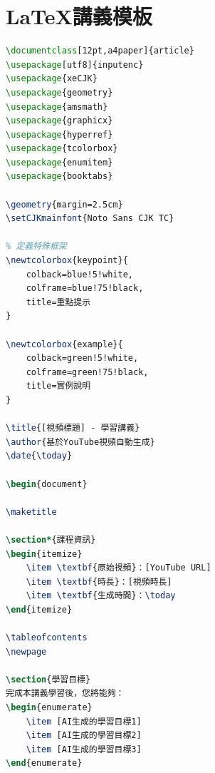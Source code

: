 \documentclass[12pt,a4paper]{article}
\begin{document}
\section{LaTeX講義模板}

\begin{lstlisting}[language=TeX, caption=YouTube講義LaTeX模板]
\documentclass[12pt,a4paper]{article}
\usepackage[utf8]{inputenc}
\usepackage{xeCJK}
\usepackage{geometry}
\usepackage{amsmath}
\usepackage{graphicx}
\usepackage{hyperref}
\usepackage{tcolorbox}
\usepackage{enumitem}
\usepackage{booktabs}

\geometry{margin=2.5cm}
\setCJKmainfont{Noto Sans CJK TC}

% 定義特殊框架
\newtcolorbox{keypoint}{
    colback=blue!5!white,
    colframe=blue!75!black,
    title=重點提示
}

\newtcolorbox{example}{
    colback=green!5!white,
    colframe=green!75!black,
    title=實例說明
}

\title{[視頻標題] - 學習講義}
\author{基於YouTube視頻自動生成}
\date{\today}

\begin{document}

\maketitle

\section*{課程資訊}
\begin{itemize}
    \item \textbf{原始視頻}：[YouTube URL]
    \item \textbf{時長}：[視頻時長]
    \item \textbf{生成時間}：\today
\end{itemize}

\tableofcontents
\newpage

\section{學習目標}
完成本講義學習後，您將能夠：
\begin{enumerate}
    \item [AI生成的學習目標1]
    \item [AI生成的學習目標2]
    \item [AI生成的學習目標3]
\end{enumerate}


\end{lstlisting}
\end{document}
